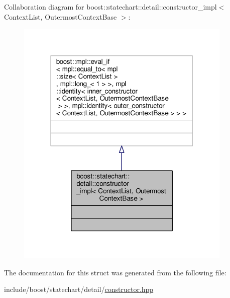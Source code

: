 Collaboration diagram for boost\+:\+:statechart\+:\+:detail\+:\+:constructor\+\_\+impl$<$ Context\+List, Outermost\+Context\+Base $>$\+:
\nopagebreak
\begin{figure}[H]
\begin{center}
\leavevmode
\includegraphics[width=292pt]{structboost_1_1statechart_1_1detail_1_1constructor__impl__coll__graph}
\end{center}
\end{figure}


The documentation for this struct was generated from the following file\+:\begin{DoxyCompactItemize}
\item 
include/boost/statechart/detail/\mbox{\hyperlink{constructor_8hpp}{constructor.\+hpp}}\end{DoxyCompactItemize}
